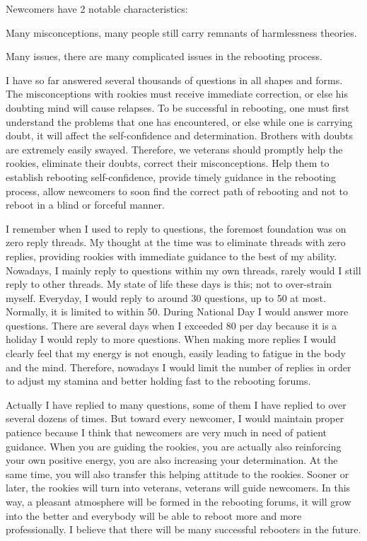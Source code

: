 \documentclass[
]{book}
\begin{document}
Newcomers have 2 notable characteristics:

Many misconceptions, many people still carry remnants of harmlessness theories.

Many issues, there are many complicated issues in the rebooting process.

I have so far answered several thousands of questions in all shapes and forms. The misconceptions with rookies must receive immediate correction, or else his doubting mind will cause relapses. To be successful in rebooting, one must first understand the problems that one has encountered, or else while one is carrying doubt, it will affect the self-confidence and determination. Brothers with doubts are extremely easily swayed. Therefore, we veterans should promptly help the rookies, eliminate their doubts, correct their misconceptions. Help them to establish rebooting self-confidence, provide timely guidance in the rebooting process, allow newcomers to soon find the correct path of rebooting and not to reboot in a blind or forceful manner.

I remember when I used to reply to questions, the foremost foundation was on zero reply threads. My thought at the time was to eliminate threads with zero replies, providing rookies with immediate guidance to the best of my ability. Nowadays, I mainly reply to questions within my own threads, rarely would I still reply to other threads. My state of life these days is this; not to over-strain myself. Everyday, I would reply to around 30 questions, up to 50 at most. Normally, it is limited to within 50. During National Day I would answer more questions. There are several days when I exceeded 80 per day because it is a holiday I would reply to more questions. When making more replies I would clearly feel that my energy is not enough, easily leading to fatigue in the body and the mind. Therefore, nowadays I would limit the number of replies in order to adjust my stamina and better holding fast to the rebooting forums.

Actually I have replied to many questions, some of them I have replied to over several dozens of times. But toward every newcomer, I would maintain proper patience because I think that newcomers are very much in need of patient guidance. When you are guiding the rookies, you are actually also reinforcing your own positive energy, you are also increasing your determination. At the same time, you will also transfer this helping attitude to the rookies. Sooner or later, the rookies will turn into veterans, veterans will guide newcomers. In this way, a pleasant atmosphere will be formed in the rebooting forums, it will grow into the better and everybody will be able to reboot more and more professionally. I believe that there will be many successful rebooters in the future.
\end{document}
